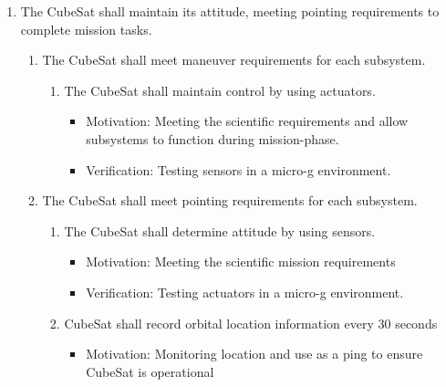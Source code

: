 \begin{enumerate}
\begin{enumerate}
\begin{enumerate}
\begin{enumerate}
\begin{itemize}
                                \item Verification:Test rig should be constructed to mimic the pusher plate and spring ejection system, with full functional verification of CubeSat performed afterwards along with manual inspection to ensure all parts remain in place 
                            \end{itemize}
                \end{enumerate}
        \end{enumerate}
    \end{enumerate} %
    \item The CubeSat shall maintain its attitude, meeting pointing requirements to complete mission tasks.
    \begin{enumerate}
        \item The CubeSat shall meet maneuver requirements for each subsystem.
        \begin{enumerate}
            \item The CubeSat shall maintain control by using actuators. 
                \begin{itemize}
                    \item Motivation: Meeting the scientific requirements and allow subsystems to function during mission-phase.
                    \item Verification: Testing sensors in a micro-g environment.
                \end{itemize}
        \end{enumerate}
        \item The CubeSat shall meet pointing requirements for each subsystem.
        \begin{enumerate}
            \item The CubeSat shall determine attitude by using sensors.
                \begin{itemize}
                    \item Motivation: Meeting the scientific mission requirements
                    \item Verification: Testing actuators in a micro-g environment.
                \end{itemize}
            \item CubeSat shall record orbital location information every 30 seconds
            \begin{itemize}
                \item Motivation: Monitoring location and use as a ping to ensure CubeSat is operational 

\end{itemize}
\end{enumerate}
\end{enumerate}
\end{enumerate}
